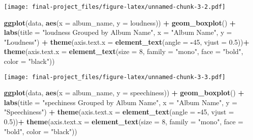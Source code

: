 \documentclass[
]{article}
\newenvironment{Shaded}{\begin{snugshade}}{\end{snugshade}}
\newcommand{\AttributeTok}[1]{\textcolor[rgb]{0.13,0.29,0.53}{#1}}
\newcommand{\DecValTok}[1]{\textcolor[rgb]{0.00,0.00,0.81}{#1}}
\newcommand{\FloatTok}[1]{\textcolor[rgb]{0.00,0.00,0.81}{#1}}
\newcommand{\FunctionTok}[1]{\textcolor[rgb]{0.13,0.29,0.53}{\textbf{#1}}}
\newcommand{\NormalTok}[1]{#1}
\newcommand{\SpecialCharTok}[1]{\textcolor[rgb]{0.81,0.36,0.00}{\textbf{#1}}}
\newcommand{\StringTok}[1]{\textcolor[rgb]{0.31,0.60,0.02}{#1}}
\begin{document}
\texttt{[image: final-project\_files/figure-latex/unnamed-chunk-3-2.pdf]}

\begin{Shaded}
\begin{Highlighting}[]
\FunctionTok{ggplot}\NormalTok{(data, }\FunctionTok{aes}\NormalTok{(}\AttributeTok{x =}\NormalTok{ album\_name, }\AttributeTok{y =}\NormalTok{ loudness)) }\SpecialCharTok{+}
  \FunctionTok{geom\_boxplot}\NormalTok{() }\SpecialCharTok{+}
  \FunctionTok{labs}\NormalTok{(}\AttributeTok{title =} \StringTok{"loudness Grouped by Album Name"}\NormalTok{, }
       \AttributeTok{x =} \StringTok{"Album Name"}\NormalTok{, }
       \AttributeTok{y =} \StringTok{"Loudness"}\NormalTok{) }\SpecialCharTok{+}
  \FunctionTok{theme}\NormalTok{(}\AttributeTok{axis.text.x =} \FunctionTok{element\_text}\NormalTok{(}\AttributeTok{angle =} \SpecialCharTok{{-}}\DecValTok{45}\NormalTok{, }\AttributeTok{vjust =} \FloatTok{0.5}\NormalTok{))}\SpecialCharTok{+}
  \FunctionTok{theme}\NormalTok{(}\AttributeTok{axis.text.x =} \FunctionTok{element\_text}\NormalTok{(}\AttributeTok{size =} \DecValTok{8}\NormalTok{, }\AttributeTok{family =} \StringTok{"mono"}\NormalTok{, }\AttributeTok{face =} \StringTok{"bold"}\NormalTok{, }\AttributeTok{color =} \StringTok{"black"}\NormalTok{))}
\end{Highlighting}
\end{Shaded}

\texttt{[image: final-project\_files/figure-latex/unnamed-chunk-3-3.pdf]}

\begin{Shaded}
\begin{Highlighting}[]
\FunctionTok{ggplot}\NormalTok{(data, }\FunctionTok{aes}\NormalTok{(}\AttributeTok{x =}\NormalTok{ album\_name, }\AttributeTok{y =}\NormalTok{ speechiness)) }\SpecialCharTok{+}
  \FunctionTok{geom\_boxplot}\NormalTok{() }\SpecialCharTok{+}
  \FunctionTok{labs}\NormalTok{(}\AttributeTok{title =} \StringTok{"spechiness Grouped by Album Name"}\NormalTok{, }
       \AttributeTok{x =} \StringTok{"Album Name"}\NormalTok{, }
       \AttributeTok{y =} \StringTok{"Speechiness"}\NormalTok{) }\SpecialCharTok{+}
  \FunctionTok{theme}\NormalTok{(}\AttributeTok{axis.text.x =} \FunctionTok{element\_text}\NormalTok{(}\AttributeTok{angle =} \SpecialCharTok{{-}}\DecValTok{45}\NormalTok{, }\AttributeTok{vjust =} \FloatTok{0.5}\NormalTok{))}\SpecialCharTok{+}
  \FunctionTok{theme}\NormalTok{(}\AttributeTok{axis.text.x =} \FunctionTok{element\_text}\NormalTok{(}\AttributeTok{size =} \DecValTok{8}\NormalTok{, }\AttributeTok{family =} \StringTok{"mono"}\NormalTok{, }\AttributeTok{face =} \StringTok{"bold"}\NormalTok{, }\AttributeTok{color =} \StringTok{"black"}\NormalTok{))}
\end{Highlighting}
\end{Shaded}
\end{document}
